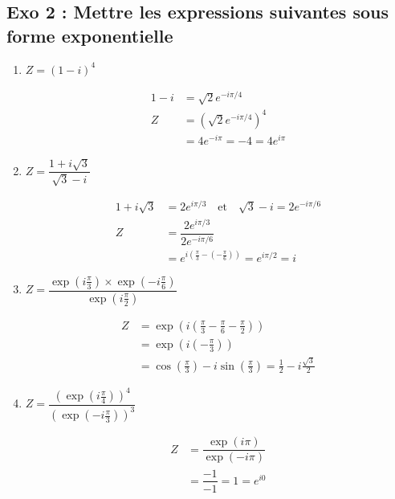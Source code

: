 \documentclass[13pt]{extarticle}
\begin{document}
\subsection{Exo 2 : Mettre les expressions suivantes sous forme
exponentielle }

\begin{enumerate}
\def\labelenumi{\arabic{enumi}.}
\item \(Z = (1-i)^4\)
\begin{framed}
\begin{align*}
1-i &= \sqrt{2}e^{-i\pi/4} \\
Z &= \left(\sqrt{2}e^{-i\pi/4}\right)^4 \\
&= 4e^{-i\pi} = -4 = 4e^{i\pi}
\end{align*}
\end{framed}

\item \(Z = \dfrac{1 + i\sqrt{3}}{\sqrt{3} - i}\)
\begin{framed}
\begin{align*}
1+i\sqrt{3} &= 2e^{i\pi/3} \quad \text{et} \quad \sqrt{3}-i = 2e^{-i\pi/6} \\
Z &= \dfrac{2e^{i\pi/3}}{2e^{-i\pi/6}} \\
&= e^{i\left(\frac{\pi}{3} - \left(-\frac{\pi}{6}\right)\right)} = e^{i\pi/2} = i
\end{align*}
\end{framed}

\item \(Z = \dfrac{\exp(i\frac{\pi}{3}) \times \exp(-i\frac{\pi}{6})}{\exp(i\frac{\pi}{2})}\)
\begin{framed}
\begin{align*}
Z &= \exp\left(i\left(\frac{\pi}{3} - \frac{\pi}{6} - \frac{\pi}{2}\right)\right) \\
&= \exp\left(i\left(-\frac{\pi}{3}\right)\right) \\
&= \cos\left(\frac{\pi}{3}\right) - i\sin\left(\frac{\pi}{3}\right) = \frac{1}{2} - i\frac{\sqrt{3}}{2}
\end{align*}
\end{framed}

\item \(Z = \dfrac{\left( \exp(i\frac{\pi}{4}) \right)^4}{\left( \exp(-i\frac{\pi}{3}) \right)^3}\)
\begin{framed}
\begin{align*}
Z &= \dfrac{\exp(i\pi)}{\exp(-i\pi)} \\
&= \dfrac{-1}{-1} = 1 = e^{i0}
\end{align*}
\end{framed}
\end{enumerate}
\end{document}
